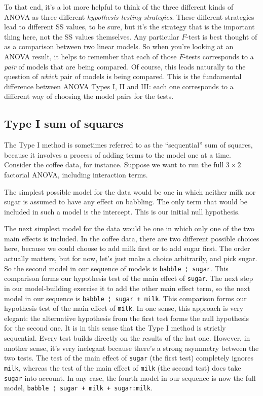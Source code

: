 \documentclass[
]{book}
\theoremstyle{definition}
\theoremstyle{definition}
\theoremstyle{definition}
\theoremstyle{definition}
\theoremstyle{remark}
\begin{document}
To that end, it's a lot more helpful to think of the three different kinds of ANOVA as three different \emph{hypothesis testing strategies}. These different strategies lead to different SS values, to be sure, but it's the strategy that is the important thing here, not the SS values themselves. Any particular \(F\)-test is best thought of as a comparison between two linear models. So when you're looking at an ANOVA result, it helps to remember that each of those \(F\)-tests corresponds to a \emph{pair} of models that are being compared. Of course, this leads naturally to the question of \emph{which} pair of models is being compared. This is the fundamental difference between ANOVA Types I, II and III: each one corresponds to a different way of choosing the model pairs for the tests.

\hypertarget{type-i-sum-of-squares}{%
\subsection{Type I sum of squares}\label{type-i-sum-of-squares}}

The Type I method is sometimes referred to as the ``sequential'' sum of squares, because it involves a process of adding terms to the model one at a time. Consider the coffee data, for instance. Suppose we want to run the full \(3 \times 2\) factorial ANOVA, including interaction terms.

The simplest possible model for the data would be one in which neither milk nor sugar is assumed to have any effect on babbling. The only term that would be included in such a model is the intercept. This is our initial null hypothesis.

The next simplest model for the data would be one in which only one of the two main effects is included. In the coffee data, there are two different possible choices here, because we could choose to add milk first or to add sugar first. The order actually matters, but for now, let's just make a choice arbitrarily, and pick sugar. So the second model in our sequence of models is \texttt{babble\ ¦\ sugar}. This comparison forms our hypothesis test of the main effect of \texttt{sugar}. The next step in our model-building exercise it to add the other main effect term, so the next model in our sequence is \texttt{babble\ ¦\ sugar\ +\ milk}. This comparison forms our hypothesis test of the main effect of \texttt{milk}. In one sense, this approach is very elegant: the alternative hypothesis from the first test forms the null hypothesis for the second one. It is in this sense that the Type I method is strictly sequential. Every test builds directly on the results of the last one. However, in another sense, it's very inelegant because there's a strong asymmetry between the two tests. The test of the main effect of \texttt{sugar} (the first test) completely ignores \texttt{milk}, whereas the test of the main effect of \texttt{milk} (the second test) does take \texttt{sugar} into account. In any case, the fourth model in our sequence is now the full model, \texttt{babble\ ¦\ sugar\ +\ milk\ +\ sugar:milk}.
\end{document}
